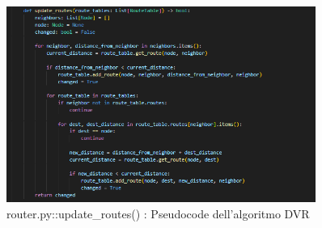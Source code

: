 \documentclass[a4paper,12pt]{report}
\begin{document}
\begin{figure}[H] %
    \centering
    \includegraphics[width=0.9\textwidth]{pseudocode.PNG}
    \caption{router.py::update\_routes() : Pseudocode dell'algoritmo DVR}
    \label{fig:pseudocode.PNG}
\end{figure}
\end{document}
